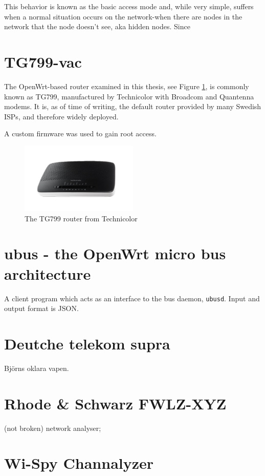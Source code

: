 This behavior is known as the basic access mode and, while very simple,
suffers when a normal situation occurs on the network-when there are nodes in
the network that the node doesn't see, aka hidden nodes. Since 

\section{TG799-vac}

The OpenWrt-based router examined in this thesis, see Figure \ref{fig:tg799}, is
commonly known as TG799, manufactured by Technicolor with Broadcom and Quantenna
modems. It is, as of time of writing, the default router provided by many
Swedish ISPs, and therefore widely deployed.

A custom firmware was used to gain root access.

\begin{figure}
\center
\includegraphics[width=0.5\textwidth]{images/tg799.png}
\caption{The TG799 router from Technicolor}
\label{fig:tg799}
\end{figure}

\section{ubus - the OpenWrt micro bus architecture}

A client program which acts as an interface to the bus daemon, \texttt{ubusd}.
Input and output format is JSON.

\section{Deutche telekom supra}

Björns oklara vapen.

\section{Rhode \& Schwarz FWLZ-XYZ}

(not broken) network analyser;

\section{Wi-Spy Channalyzer}

